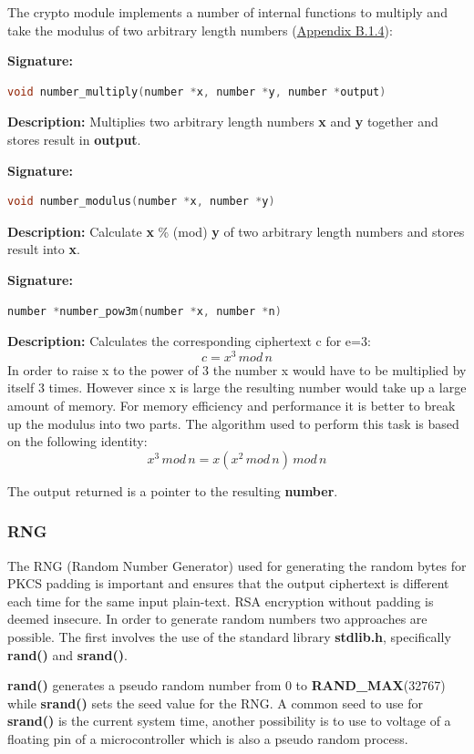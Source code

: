 The crypto module implements a number of internal functions to multiply and take the modulus of two arbitrary length numbers (\hyperref[sec:rsacpp]{Appendix B.1.4}):

\textbf{Signature: } 
\begin{lstlisting}[language=C]
void number_multiply(number *x, number *y, number *output)
\end{lstlisting}
\textbf{Description: }  \linebreak
Multiplies  two arbitrary length numbers \textbf{x} and \textbf{y} together and stores result in \textbf{output}.

\textbf{Signature: } 
\begin{lstlisting}[language=C]
void number_modulus(number *x, number *y)
\end{lstlisting}
\textbf{Description: }  \linebreak
Calculate \textbf{x} \% (mod) \textbf{y} of two arbitrary length numbers and stores result into \textbf{x}.

\textbf{Signature: } 
\begin{lstlisting}[language=C]
number *number_pow3m(number *x, number *n)
\end{lstlisting}
\textbf{Description: }  \linebreak
Calculates the corresponding ciphertext c for e=3:\[ c = x^3\,mod\,n\]
In order to raise x to the power of 3 the number x would have to be multiplied by itself 3 times. However since x is large the resulting number would take up a large amount of memory. For memory efficiency and performance it is better to break up the modulus into two parts. The algorithm used to perform this task is based on the following identity:
\[ x^3\,mod\,n = x(x^2\,mod\,n)\,mod\,n\]

The output returned is a pointer to the resulting \textbf{number}.
\subsubsection{RNG}
The RNG (Random Number Generator) used for generating the random bytes for PKCS padding is important and ensures that the output ciphertext is different each time for the same input plain-text. RSA encryption without padding is deemed insecure. In order to generate random numbers two approaches are possible. The first involves the use of the standard library \textbf{stdlib.h}, specifically \textbf{rand()} and \textbf{srand()}. 

\textbf{rand()} generates a pseudo random number from 0 to \textbf{RAND\_MAX}(32767) while \textbf{srand()} sets the seed value for the RNG. A common seed to use for \textbf{srand()} is the current system time, another possibility is to use to voltage of a floating pin of a microcontroller which is also a pseudo random process.


